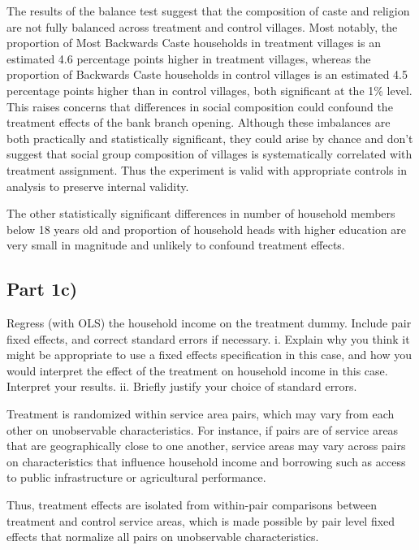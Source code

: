 \documentclass[12pt]{article}
\begin{document}
The results of the balance test suggest that the composition of caste and religion are not fully balanced across treatment and control villages. Most notably, the proportion of Most Backwards Caste households in treatment villages is an estimated 4.6 percentage points higher in treatment villages, whereas the proportion of Backwards Caste households in control villages is an estimated 4.5 percentage points higher than in control villages, both significant at the 1\% level. This raises concerns that differences in social composition could confound the treatment effects of the bank branch opening. Although these imbalances are both practically and statistically significant, they could arise by chance and don't suggest that social group composition of villages is systematically correlated with treatment assignment. Thus the experiment is valid with appropriate controls in analysis to preserve internal validity.

The other statistically significant differences in number of household members below 18 years old and proportion of household heads with higher education are very small in magnitude and unlikely to confound treatment effects. 

\subsection*{Part 1c)}

Regress (with OLS) the household income on the treatment dummy. Include pair fixed
effects, and correct standard errors if necessary.
i. Explain why you think it might be appropriate to use a fixed effects specification in
this case, and how you would interpret the effect of the treatment on household
income in this case. Interpret your results.
ii. Briefly justify your choice of standard errors.




Treatment is randomized within service area pairs, which may vary from each other on unobservable characteristics. For instance, if pairs are of service areas that are geographically close to one another, service areas may vary across pairs on characteristics that influence household income and borrowing such as access to public infrastructure or agricultural performance. 

Thus, treatment effects are isolated from within-pair comparisons between treatment and control service areas, which is made possible by pair level fixed effects that normalize all pairs on unobservable characteristics.
\end{document}
